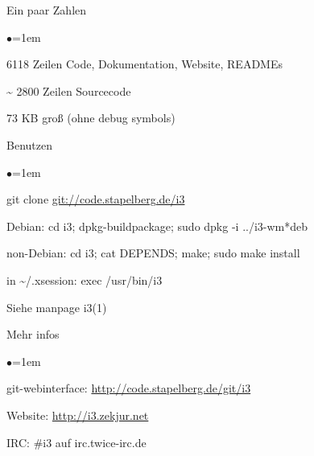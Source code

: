 \documentclass[mode=print,paper=screen,style=jefka]{powerdot}
\begin{document}
\begin{slide}{Ein paar Zahlen}
\begin{list}{$\bullet$}{\itemsep=1em}
	\item<1-> 6118 Zeilen Code, Dokumentation, Website, READMEs
	\item<2-> \~{} 2800 Zeilen Sourcecode
	\item<3-> 73 KB groß (ohne debug symbols)
\end{list}
\end{slide}

\begin{slide}{Benutzen}
\begin{list}{$\bullet$}{\itemsep=1em}
	\item git clone \url{git://code.stapelberg.de/i3}
	\item Debian: cd i3; dpkg-buildpackage; sudo dpkg -i ../i3-wm*deb
	\item non-Debian: cd i3; cat DEPENDS; make; sudo make install
	\item in \~{}/.xsession: exec /usr/bin/i3
	\item Siehe manpage i3(1)
\end{list}
\end{slide}

\begin{slide}{Mehr infos}
\begin{list}{$\bullet$}{\itemsep=1em}
	\item git-webinterface: \url{http://code.stapelberg.de/git/i3}
	\item Website: \url{http://i3.zekjur.net}
	\item IRC: \#i3 auf irc.twice-irc.de
\end{list}
\end{slide}
\end{document}

